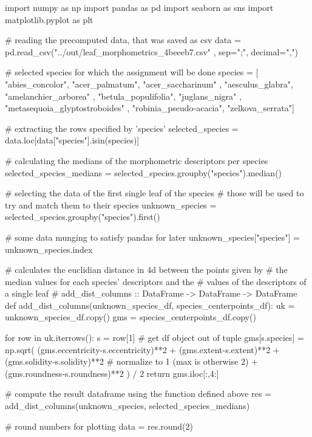 \subject{classify.py}

\startPYTHON
import numpy as np
import pandas as pd
import seaborn as sns
import matplotlib.pyplot as plt

# reading the precomputed data, that was saved as csv
data = pd.read_csv("../out/leaf_morphometrics_4beeeb7.csv"
                  , sep=";", decimal=",")

# selected species for which the assignment will be done
species = [ "abies_concolor", "acer_palmatum", "acer_saccharinum"
          , "aesculus_glabra", "amelanchier_arborea"
          , "betula_populifolia", "juglans_nigra"
          , "metasequoia_glyptostroboides"
          , "robinia_pseudo-acacia", "zelkova_serrata"]

# extracting the rows specified by 'species'
selected_species = data.loc[data["species"].isin(species)]

# calculating the medians of the morphometric descriptors per species
selected_species_medians = selected_species.groupby("species").median()

# selecting the data of the first single leaf of the species
# those will be used to try and match them to their species 
unknown_species = selected_species.groupby("species").first()

# some data munging to satisfy pandas for later
unknown_species["species"] = unknown_species.index

# calculates the euclidian distance in 4d between the points given by
# the median values for each species' descriptors and the 
# values of the descriptors of a single leaf
# add_dist_columns :: DataFrame -> DataFrame -> DataFrame
def add_dist_columns(unknown_species_df, species_centerpoints_df):
    uk = unknown_species_df.copy()
    gms = species_centerpoints_df.copy()
    
    for row in uk.iterrows():
        s = row[1] # get df object out of tuple
        gms[s.species] = np.sqrt( (gms.eccentricity-s.eccentricity)**2 
                                + (gms.extent-s.extent)**2 
                                + (gms.solidity-s.solidity)**2
                                # normalize to 1 (max is otherwise 2)
                                + (gms.roundness-s.roundness)**2 ) / 2 
    return gms.iloc[:,4:]
    

# compute the result dataframe using the function defined above
res = add_dist_columns(unknown_species, selected_species_medians)

# round numbers for plotting
data = res.round(2)

